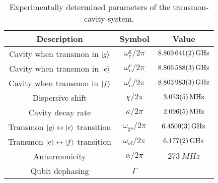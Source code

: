 
\begin{table}[htb!]
\centering
\begin{tabular}{c|c|c} 
Description   &   Symbol       & Value                                     \\ 
\hline
Cavity when transmon in $\ket{g} $   &   $\omega _\text{c} ^{\text{g}} / 2 \pi $      &    $\SI{8.809641 (2) }{GHz}$                   \\ 
\hline
Cavity when transmon in $\ket{e} $   &   $\omega _\text{c} ^{\text{e}} / 2 \pi $      &    $\SI{8.806588 (3) }{GHz}$                   \\ 
\hline
Cavity when transmon in $\ket{f} $   &   $\omega _\text{c} ^{\text{f}} / 2 \pi $      &    $\SI{8.803983 (3) }{GHz}$                   \\ 
\hline
Dispersive shift                     &   $\chi /2 \pi $                                 &    $\SI{3.053 (5) }{MHz}$                    \\ 
\hline
Cavity decay rate                     &   $\kappa /2 \pi $                                 &    $\SI{2.096 (5) }{MHz}$                 \\ 
\hline
Transmon $\ket{g} \leftrightarrow  \ket{e}$ transition   &   $\omega _\text{ge}  / 2 \pi $      &    $\SI{6.4500 (3) }{GHz}$           \\ 
\hline
Transmon $\ket{e} \leftrightarrow \ket{f}$ transition   &   $\omega _\text{ef}  / 2 \pi $      &    $\SI{6.177 (2) }{GHz}$             \\ 
\hline
Anharmonicity                         &   $\alpha  / 2 \pi $                                 &         $\SI{273}{MHz}$                 \\ 
\hline
Qubit dephasing                       & $\Gamma$                                          &                                            \\
\end{tabular} 
\caption{ Experimentally determined parameters of the transmon-cavity-system.  }
\label{tab:variablen}
\end{table}

